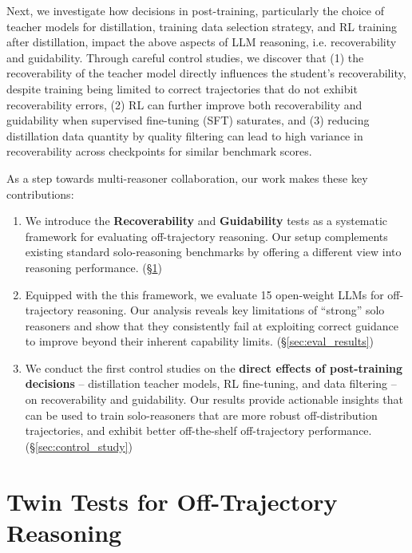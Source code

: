 \documentclass{article} %
\begin{document}
Next, we investigate how decisions in post-training, particularly the choice of teacher models for distillation, training data selection strategy, and RL training after distillation, impact the above aspects of LLM reasoning, i.e. recoverability and guidability. Through careful control studies, we discover that (1) the recoverability of the teacher model directly influences the student's recoverability, despite training being limited to correct trajectories that do not exhibit recoverability errors, (2) RL can further improve both recoverability and guidability when supervised fine-tuning (SFT) saturates, and  (3) reducing distillation data quantity by quality filtering can lead to high variance in recoverability across checkpoints for similar benchmark scores.

As a step towards multi-reasoner collaboration, our work makes these key contributions:
\begin{enumerate}
[leftmargin=*, itemsep=0pt, topsep=0pt]
    \item We introduce the \textbf{Recoverability} and \textbf{Guidability} tests as a systematic framework for evaluating off-trajectory reasoning. Our setup complements existing standard solo-reasoning benchmarks by offering a different view into reasoning performance. (\S \ref{sec:twin_test_desc})
    \item Equipped with the this framework, we evaluate 15 open-weight LLMs for off-trajectory reasoning. Our analysis reveals key limitations of ``strong'' solo reasoners and show that they consistently fail at exploiting correct guidance to improve beyond their inherent capability limits.
    (\S \ref{sec:eval_results})
    \item We conduct the first control studies on the \textbf{direct effects of post-training decisions} -- distillation teacher models, RL fine-tuning, and data filtering -- on recoverability and guidability. Our results provide actionable insights that can be used to train solo-reasoners that are more robust off-distribution trajectories, and exhibit better off-the-shelf off-trajectory performance.  (\S \ref{sec:control_study})
\end{enumerate}

\section{Twin Tests for Off-Trajectory Reasoning}
\label{sec:twin_test_desc}
\end{document}
